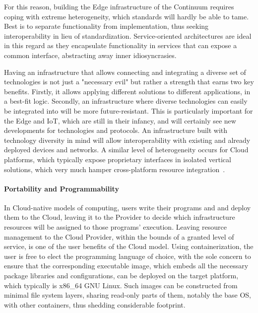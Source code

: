 For this reason, building the Edge infrastructure of the Continuum requires coping with extreme heterogeneity, which standards will hardly be able to tame.
Best is to separate functionality from implementation, thus seeking interoperability in lieu of standardization. Service-oriented architectures are ideal in this regard as they encapsulate functionality in services that can expose a common interface, abstracting away inner idiosyncrasies.

Having an infrastructure that allows connecting and integrating a diverse set of technologies is not just a "necessary evil" but rather a strength that earns two key benefits. Firstly, it allows applying different solutions to different applications, in a best-fit logic. 
Secondly, an infrastructure where diverse technologies can easily be integrated into will be more future-resistant. 
This is particularly important for the Edge and IoT, which are still in their infancy, and will certainly see new developments for technologies and protocols. An infrastructure built with technology diversity in mind will allow interoperability with existing and already deployed devices and networks.
A similar level of heterogeneity occurs for Cloud platforms, which typically expose proprietary interfaces in isolated vertical solutions, which very much hamper cross-platform resource integration~\cite{grozev2014inter}. 

\paragraph{Portability and Programmability}

In Cloud-native models of computing, users write their programs and and deploy them to the Cloud, leaving it to the Provider to decide which infrastructure resources will be assigned to those programs' execution.
Leaving resource management to the Cloud Provider, within the bounds of a granted level of service, is one of the user benefits of the Cloud model.
Using containerization, the user is free to elect the programming language of choice, with the sole concern to ensure that the corresponding executable image, which embeds all the necessary package libraries and configurations, can be deployed on the target platform, which typically is x86\_64 GNU Linux. 
Such images can be constructed from minimal file system layers, sharing read-only parts of them, notably the base OS, with other containers, thus shedding considerable footprint. 

